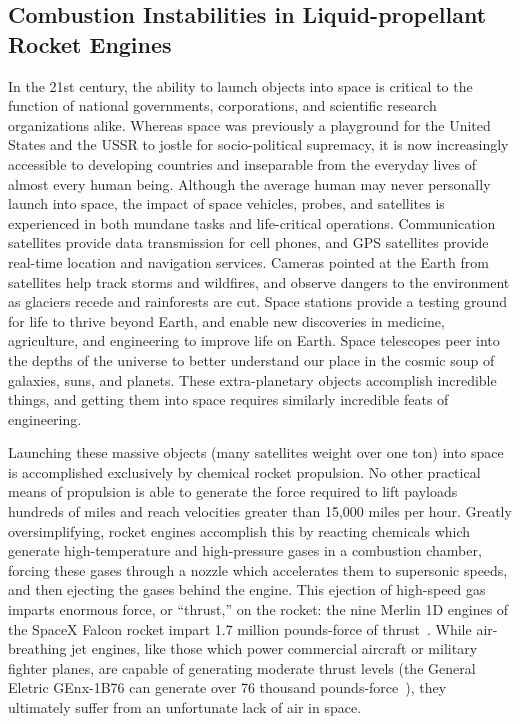 \subsection{Combustion Instabilities in Liquid-propellant Rocket Engines}

In the 21st century, the ability to launch objects into space is critical to the function of national governments, corporations, and scientific research organizations alike. Whereas space was previously a playground for the United States and the USSR to jostle for socio-political supremacy, it is now increasingly accessible to developing countries and inseparable from the everyday lives of almost every human being. Although the average human may never personally launch into space, the impact of space vehicles, probes, and satellites is experienced in both mundane tasks and life-critical operations. Communication satellites provide data transmission for cell phones, and GPS satellites provide real-time location and navigation services. Cameras pointed at the Earth from satellites help track storms and wildfires, and observe dangers to the environment as glaciers recede and rainforests are cut. Space stations provide a testing ground for life to thrive beyond Earth, and enable new discoveries in medicine, agriculture, and engineering to improve life on Earth. Space telescopes peer into the depths of the universe to better understand our place in the cosmic soup of galaxies, suns, and planets. These extra-planetary objects accomplish incredible things, and getting them into space requires similarly incredible feats of engineering.

Launching these massive objects (many satellites weight over one ton) into space is accomplished exclusively by chemical rocket propulsion. No other practical means of propulsion is able to generate the force required to lift payloads hundreds of miles and reach velocities greater than 15,000 miles per hour. Greatly oversimplifying, rocket engines accomplish this by reacting chemicals which generate high-temperature and high-pressure gases in a combustion chamber, forcing these gases through a nozzle which accelerates them to supersonic speeds, and then ejecting the gases behind the engine. This ejection of high-speed gas imparts enormous force, or ``thrust,'' on the rocket: the nine Merlin 1D engines of the SpaceX Falcon rocket impart 1.7 million pounds-force of thrust~\cite{falconGuide}. While air-breathing jet engines, like those which power commercial aircraft or military fighter planes, are capable of generating moderate thrust levels (the General Eletric GEnx-1B76 can generate over 76 thousand pounds-force~\cite{genxSpecs}), they ultimately suffer from an unfortunate lack of air in space.

